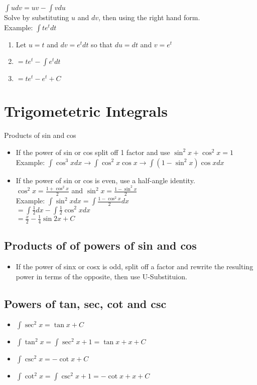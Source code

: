 \documentclass{article}
\begin{document}
$\int{udv} = uv - \int{vdu}$\\

Solve by substituting $u$ and $dv$, then using the right hand form.\\

Example: $\int{t e^t dt}$
\begin{enumerate}
  \item Let $u = t$ and $dv = e^t dt$ so that $du = dt$ and $v = e^t$
  \item $= t e^t - \int{e^t dt}$
  \item $= t e^t - e^t + C$
\end{enumerate}

\section{Trigometetric Integrals}
Products of sin and cos
\begin{itemize}
  \item If the power of sin or cos split off 1 factor and use $\sin^2x + \cos^2x = 1$\\
  Example: $\int{\cos^3x dx} \to \int{\cos^2x \cos x} \to \int{(1-\sin^2x)\cos x dx}$
  \item If the power of sin or cos is even, use a half-angle identity.\\
  $\cos^2x = \frac{1 + \cos^2x}{2}$ and $\sin^2x = \frac{1 - \sin^2x}{2}$\\
  Example: $\int{\sin^2x dx} = \int{\frac{1- \cos^2x}{2}dx}$\\
  $= \int{\frac{1}{2}dx} - \int{\frac{1}{2}\cos^2x dx}$\\
  $= \frac{x}{2} - \frac{1}{4}\sin 2x + C$
\end{itemize}

\subsection{Products of of powers of sin and cos}
\begin{itemize}
  \item If the power of sinx or cosx is odd, split off a factor and rewrite the resulting power in terms of the opposite, then use U-Substituion.
\end{itemize}

\subsection{Powers of tan, sec, cot and csc}
\begin{itemize}
  \item $\int{\sec^2x} = \tan x + C$
  \item $\int{\tan^2x} = \int{\sec^2x + 1} = \tan x + x + C$
  \item $\int{\csc^2x} = -\cot x + C$
  \item $\int{\cot^2x} = \int{\csc^2x + 1} = -\cot x + x + C$
\end{itemize}
\end{document}
